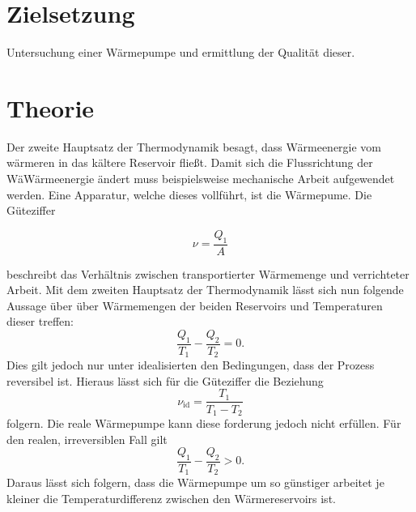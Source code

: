 \section{Zielsetzung}
Untersuchung einer Wärmepumpe und ermittlung der Qualität dieser.
\section{Theorie}
\label{sec:Theorie}

Der zweite Hauptsatz der Thermodynamik besagt, dass Wärmeenergie vom wärmeren in das kältere Reservoir fließt.
Damit sich die Flussrichtung der WäWärmeenergie ändert muss beispielsweise mechanische Arbeit aufgewendet werden.
Eine Apparatur, welche dieses vollführt, ist die Wärmepume.
Die Güteziffer

\begin{equation}
	\label{eq:gl1}
	\nu=\frac{Q_1}{A}
\end{equation}

beschreibt das Verhältnis zwischen transportierter Wärmemenge und verrichteter Arbeit.
Mit dem zweiten Hauptsatz der Thermodynamik lässt sich nun folgende Aussage über über Wärmemengen der beiden Reservoirs und Temperaturen dieser treffen:
\begin{equation}
		\label{eq:gl2}
	\frac{Q_1}{T_1}-\frac{Q_2}{T_2}=0.
\end{equation}
Dies gilt jedoch nur unter idealisierten den Bedingungen, dass der Prozess reversibel ist.
Hieraus lässt sich für die Güteziffer die Beziehung
\begin{equation}
	\nu_{\text{id}}=\frac{T_1}{T_1-T_2}
	\label{eq:guetezifferideal}
\end{equation}
folgern.
Die reale Wärmepumpe kann diese forderung jedoch nicht erfüllen.
Für den realen, irreversiblen Fall gilt
\begin{equation}
		\label{eq:gl3}
	\frac{Q_1}{T_1}-\frac{Q_2}{T_2}>0 .
\end{equation}
Daraus lässt sich folgern, dass die Wärmepumpe um so günstiger arbeitet je kleiner die Temperaturdifferenz zwischen den Wärmereservoirs ist.
